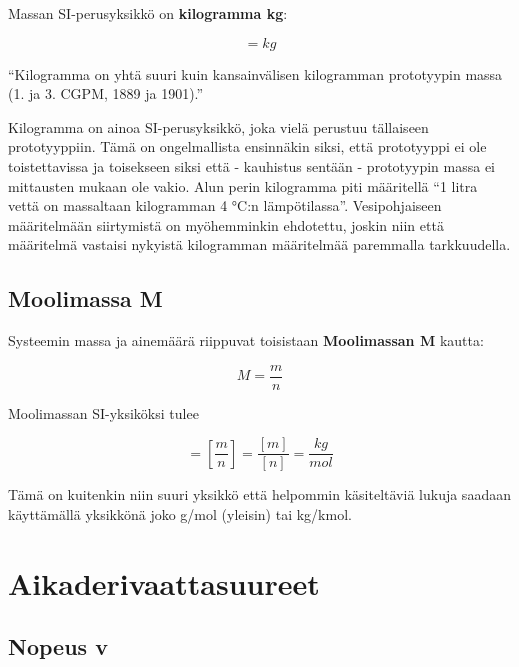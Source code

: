 \documentclass[12pt,a4paper,finnish]{book}
\begin{document}
Massan SI-perusyksikkö on \textbf{kilogramma kg}:

\begin{equation}
 [m] = kg
\end{equation}

``Kilogramma on yhtä suuri kuin kansainvälisen kilogramman prototyypin massa (1. ja 3. CGPM, 1889 ja 1901).''

Kilogramma on ainoa SI-perusyksikkö, joka vielä perustuu tällaiseen prototyyppiin. Tämä on ongelmallista ensinnäkin 
siksi, että prototyyppi ei ole toistettavissa ja toisekseen siksi että - kauhistus sentään - prototyypin massa 
ei mittausten mukaan ole vakio. Alun perin kilogramma piti määritellä ``1 litra vettä on massaltaan kilogramman 
4 °C:n lämpötilassa''. Vesipohjaiseen määritelmään siirtymistä on myöhemminkin ehdotettu, joskin niin että 
määritelmä vastaisi nykyistä kilogramman määritelmää paremmalla tarkkuudella.

\subsection{Moolimassa M}

Systeemin massa ja ainemäärä riippuvat toisistaan \textbf{Moolimassan M} kautta:

\begin{equation}
 M = \frac{m}{n}
\end{equation}

Moolimassan SI-yksiköksi tulee

\begin{equation}
 [M] = \left[\frac{m}{n}\right] = \frac{[m]}{[n]} = \frac{kg}{mol}
\end{equation}

Tämä on kuitenkin niin suuri yksikkö että helpommin käsiteltäviä lukuja saadaan käyttämällä yksikkönä joko 
g/mol (yleisin) tai kg/kmol.

\section{Aikaderivaattasuureet} %



\subsection{Nopeus v}
\end{document}
